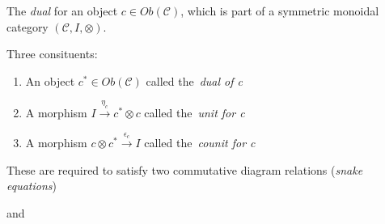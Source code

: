 The \emph{dual} for an object $c \in Ob(\mathcal{C})$, which is part of a symmetric monoidal category $(\mathcal{C},I,\otimes)$.

Three consituents:
\begin{enumerate}
  \item An object $c^* \in Ob(\mathcal{C})$ called the \,\emph{dual of c}\,
  \item A morphism $I\xrightarrow{\eta_c}c^* \otimes c$ called the \,\emph{unit for c}\,
  \item A morphism $c \otimes c^* \xrightarrow{\epsilon_c}I$ called the \,\emph{counit for c}\,

\end{enumerate}
These are required to satisfy two commutative diagram relations (\emph{snake equations})



  and


